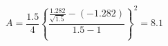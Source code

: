 

\[
A = \frac{1.5}{4} \left\{ \frac{\frac{1.282}{\sqrt{1.5}} - (-1.282)}{1.5 - 1} \right\} ^{2} = 8.1
\]



